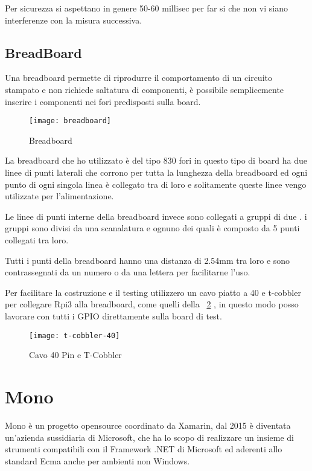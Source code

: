 Per sicurezza si aspettano in genere 50-60 millisec per far si che non vi siano interferenze con la misura successiva.

\subsection{BreadBoard}
Una breadboard permette di riprodurre il comportamento di un circuito stampato e non richiede saltatura di componenti, è possibile semplicemente inserire i componenti nei fori predisposti sulla board.

\begin{figure}[htbp!] 
	\centering    
	\texttt{[image: breadboard]}
	\caption[Breadboard]{Breadboard}
	\label{fig:breadboard}
\end{figure}

La breadboard che ho utilizzato è del tipo 830 fori in questo tipo di board ha due linee di punti laterali che corrono per tutta la lunghezza della breadboard ed ogni punto di ogni singola linea è collegato tra di loro e solitamente queste linee vengo utilizzate per l’alimentazione. 

Le linee di punti interne della breadboard invece sono collegati a gruppi di due . i gruppi sono divisi da una scanalatura e ognuno dei quali è composto da 5 punti collegati tra loro.

Tutti i punti della breadboard  hanno una distanza di 2.54mm tra loro e sono contrassegnati da un numero o da una lettera per facilitarne l'uso.

Per facilitare la costruzione e il testing utilizzero un cavo piatto a 40 e t-cobbler per collegare Rpi3 alla breadboard, come quelli della \figurename~\ref{fig:t-cobbler-40}  , in questo modo posso lavorare con tutti i GPIO direttamente sulla board di test.


\begin{figure}[htbp!] 
	\centering    
	\texttt{[image: t-cobbler-40]}
	\caption[t-cobbler-40]{Cavo 40 Pin e T-Cobbler}
	\label{fig:t-cobbler-40}
\end{figure}


\section{Mono}
Mono è un progetto opensource coordinato da Xamarin, dal 2015 è diventata un'azienda sussidiaria di Microsoft, che ha lo scopo di realizzare  un insieme di strumenti compatibili con il Framework .NET di Microsoft ed aderenti allo standard Ecma anche per ambienti non Windows.

